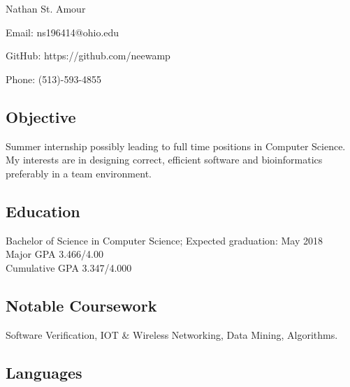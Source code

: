 \documentclass[11pt]{article} %
\date{}
\newcommand{\name}[1]{
  \centerline{\Huge{#1}}
  }
\begin{document}
\thispagestyle{empty}
\name{Nathan St. Amour}
\begin{center}

 
 
\centerline{\large{Email: ns196414@ohio.edu}}
\centerline{GitHub: https://github.com/neewamp}
\centerline{\large{Phone: (513)-593-4855}}

\end{center}
\subsection*{Objective}
 Summer internship possibly leading to full time positions in Computer Science. My interests are in designing correct, efficient software and bioinformatics preferably in a team environment.
 \subsection*{Education}
 Bachelor of Science in Computer Science; Expected graduation: May 2018\\
 Major GPA   3.466/4.00 \\
 Cumulative GPA   3.347/4.000


 \subsection*{Notable Coursework}
Software Verification, IOT \& Wireless Networking, Data Mining,
Algorithms.
\subsection*{Languages}


\end{document}
